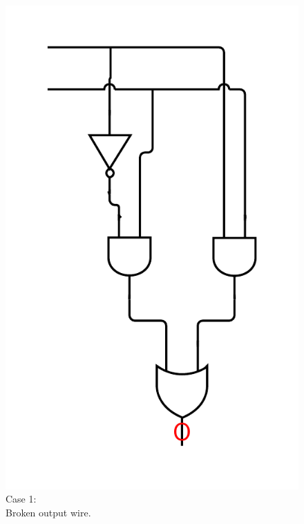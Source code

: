 \documentclass[10pt,a4paper]{scrartcl}
\begin{document}
\begin{figure}[h]
  \centering\includegraphics[width=\linewidth]{images/exercise_6_2_output.png}
  \caption{Case 1: \\Broken output wire.}
  \endminipage

\end{figure}
\end{document}
